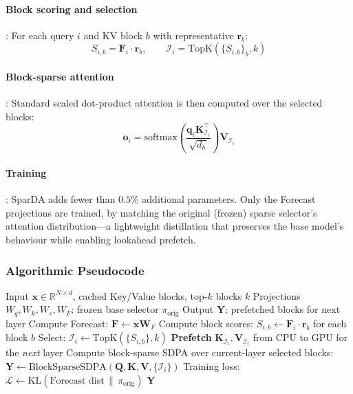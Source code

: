 \paragraph{Block scoring and selection}: For each query $i$ and KV block $b$ with representative $\mathbf{r}_b$:
\[
S_{i,b} = \mathbf{F}_i \cdot \mathbf{r}_b, \qquad \mathcal{I}_i = \mathrm{TopK}(\{S_{i,b}\}_b, k)
\]
\paragraph{Block-sparse attention}: Standard scaled dot-product attention is then computed over the selected blocks:
\[
\mathbf{o}_i = \mathrm{softmax}\left(\frac{\mathbf{q}_i \mathbf{K}_{\mathcal{I}_i}^\top}{\sqrt{d_h}}\right) \mathbf{V}_{\mathcal{I}_i}
\]
\paragraph{Training}: SparDA adds fewer than $0.5\%$ additional parameters. Only the Forecast projections are trained, by matching the original (frozen) sparse selector's attention distribution---a lightweight distillation that preserves the base model's behaviour while enabling lookahead prefetch.

\subsubsection{Algorithmic Pseudocode}

\begin{algorithm}[H]
\caption{SparDA: Sparse Decoupled Attention with Forecast Prefetch}
\begin{algorithmic}[1]
\Require Input $\mathbf{x} \in \mathbb{R}^{N \times d}$, cached Key/Value blocks, top-$k$ blocks $k$
\Require Projections $W_q, W_k, W_v, W_F$; frozen base selector $\pi_{\text{orig}}$
\Ensure Output $\mathbf{Y}$; prefetched blocks for next layer
\State Compute Forecast: $\mathbf{F} \gets \mathbf{x} \mathbf{W}_F$ 
    \State Compute block scores: $S_{i,b} \gets \mathbf{F}_i \cdot \mathbf{r}_b$ for each block $b$
    \State Select: $\mathcal{I}_i \gets \mathrm{TopK}(\{S_{i,b}\}, k)$
    \State \textbf{Prefetch} $\mathbf{K}_{\mathcal{I}_i}, \mathbf{V}_{\mathcal{I}_i}$ from CPU to GPU for the \emph{next} layer 
\EndFor
\State Compute block-sparse SDPA over current-layer selected blocks: $\mathbf{Y} \gets \mathrm{BlockSparseSDPA}(\mathbf{Q}, \mathbf{K}, \mathbf{V}, \{\mathcal{I}_i\})$
\State Training loss: $\mathcal{L} \gets \mathrm{KL}(\text{Forecast dist} \,\|\, \pi_{\text{orig}})$ 
\Return $\mathbf{Y}$
\end{algorithmic}
\end{algorithm}


